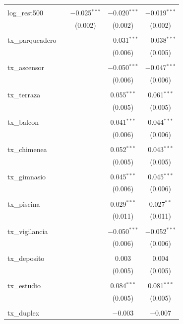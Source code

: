\begin{table}[!htbp]
\begin{tabular}{@{\extracolsep{5pt}}lcccc}
  & & & & \\ 
 log\_rest500 &  & $-$0.025$^{***}$ & $-$0.020$^{***}$ & $-$0.019$^{***}$ \\ 
  &  & (0.002) & (0.002) & (0.002) \\ 
  & & & & \\ 
 tx\_parqueadero &  &  & $-$0.031$^{***}$ & $-$0.038$^{***}$ \\ 
  &  &  & (0.006) & (0.005) \\ 
  & & & & \\ 
 tx\_ascensor &  &  & $-$0.050$^{***}$ & $-$0.047$^{***}$ \\ 
  &  &  & (0.006) & (0.006) \\ 
  & & & & \\ 
 tx\_terraza &  &  & 0.055$^{***}$ & 0.061$^{***}$ \\ 
  &  &  & (0.005) & (0.005) \\ 
  & & & & \\ 
 tx\_balcon &  &  & 0.041$^{***}$ & 0.044$^{***}$ \\ 
  &  &  & (0.006) & (0.006) \\ 
  & & & & \\ 
 tx\_chimenea &  &  & 0.052$^{***}$ & 0.043$^{***}$ \\ 
  &  &  & (0.005) & (0.005) \\ 
  & & & & \\ 
 tx\_gimnasio &  &  & 0.045$^{***}$ & 0.045$^{***}$ \\ 
  &  &  & (0.006) & (0.006) \\ 
  & & & & \\ 
 tx\_piscina &  &  & 0.029$^{***}$ & 0.027$^{**}$ \\ 
  &  &  & (0.011) & (0.011) \\ 
  & & & & \\ 
 tx\_vigilancia &  &  & $-$0.050$^{***}$ & $-$0.052$^{***}$ \\ 
  &  &  & (0.006) & (0.006) \\ 
  & & & & \\ 
 tx\_deposito &  &  & 0.003 & 0.004 \\ 
  &  &  & (0.005) & (0.005) \\ 
  & & & & \\ 
 tx\_estudio &  &  & 0.084$^{***}$ & 0.081$^{***}$ \\ 
  &  &  & (0.005) & (0.005) \\ 
  & & & & \\ 
 tx\_duplex &  &  & $-$0.003 & $-$0.007 \\ 

\end{tabular}
\end{table}
